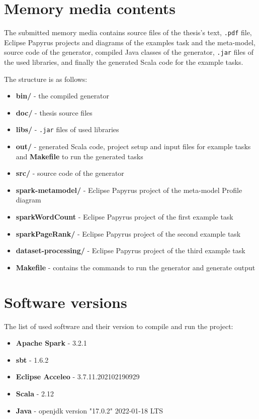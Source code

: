 
\chapter{Memory media contents}

The submitted memory media contains source files of the thesis's text, \texttt{.pdf} file, Eclipse Papyrus projects and diagrams of the examples task and the meta-model, source code of the generator, compiled Java classes of the generator, \texttt{.jar} files of the used libraries, and finally the generated Scala code for the example tasks.

The structure is as follows:

\begin{itemize}
    \item \textbf{bin/} - the compiled generator
    \item \textbf{doc/} - thesis source files
    \item \textbf{libs/} - \texttt{.jar} files of used libraries
    \item \textbf{out/} - generated Scala code, project setup and input files for example tasks and \textbf{Makefile} to run the generated tasks
    \item \textbf{src/} - source code of the generator
    \item \textbf{spark-metamodel/} - Eclipse Papyrus project of the meta-model Profile diagram
    \item \textbf{sparkWordCount} - Eclipse Papyrus project of the first example task
    \item \textbf{sparkPageRank/} - Eclipse Papyrus project of the second example task
    \item \textbf{dataset-processing/} - Eclipse Papyrus project of the third example task
    \item \textbf{Makefile} - contains the commands to run the generator and generate output 
\end{itemize}

\chapter{Software versions}

The list of used software and their version to compile and run the project:

\begin{itemize}
    \item \textbf{Apache Spark} - 3.2.1
    \item \textbf{sbt} - 1.6.2
    \item \textbf{Eclipse Acceleo} - 3.7.11.202102190929
    \item \textbf{Scala} - 2.12
    \item \textbf{Java} - openjdk version "17.0.2" 2022-01-18 LTS
\end{itemize}